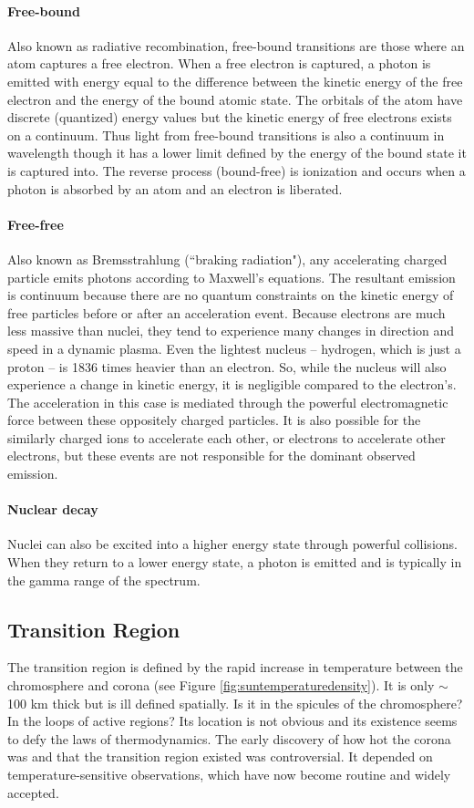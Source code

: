 \paragraph{Free-bound}
Also known as radiative recombination, free-bound transitions are those where an atom captures a free electron. When a free electron is captured, a photon is emitted with energy equal to the difference between the kinetic energy of the free electron and the energy of the bound atomic state. The orbitals of the atom have discrete (quantized) energy values but the kinetic energy of free electrons exists on a continuum. Thus light from free-bound transitions is also a continuum in wavelength though it has a lower limit defined by the energy of the bound state it is captured into. The reverse process (bound-free) is ionization and occurs when a photon is absorbed by an atom and an electron is liberated. 

\paragraph{Free-free}
Also known as Bremsstrahlung (``braking radiation"), any accelerating charged particle emits photons according to Maxwell's equations. The resultant emission is continuum because there are no quantum constraints on the kinetic energy of free particles before or after an acceleration event. Because electrons are much less massive than nuclei, they tend to experience many changes in direction and speed in a dynamic plasma. Even the lightest nucleus -- hydrogen, which is just a proton -- is 1836 times heavier than an electron. So, while the nucleus will also experience a change in kinetic energy, it is negligible compared to the electron's. The acceleration in this case is mediated through the powerful electromagnetic force between these oppositely charged particles. It is also possible for the similarly charged ions to accelerate each other, or electrons to accelerate other electrons, but these events are not responsible for the dominant observed emission. 

\paragraph{Nuclear decay}
Nuclei can also be excited into a higher energy state through powerful collisions. When they return to a lower energy state, a photon is emitted and is typically in the gamma range of the spectrum. 

\subsection{Transition Region}
The transition region is defined by the rapid increase in temperature between the chromosphere and corona (see Figure \ref{fig:suntemperaturedensity}). It is only $\sim$100 km thick but is ill defined spatially. Is it in the spicules of the chromosphere? In the loops of active regions? Its location is not obvious and its existence seems to defy the laws of thermodynamics. The early discovery of how hot the corona was and that the transition region existed was controversial. It depended on temperature-sensitive observations, which have now become routine and widely accepted. 

